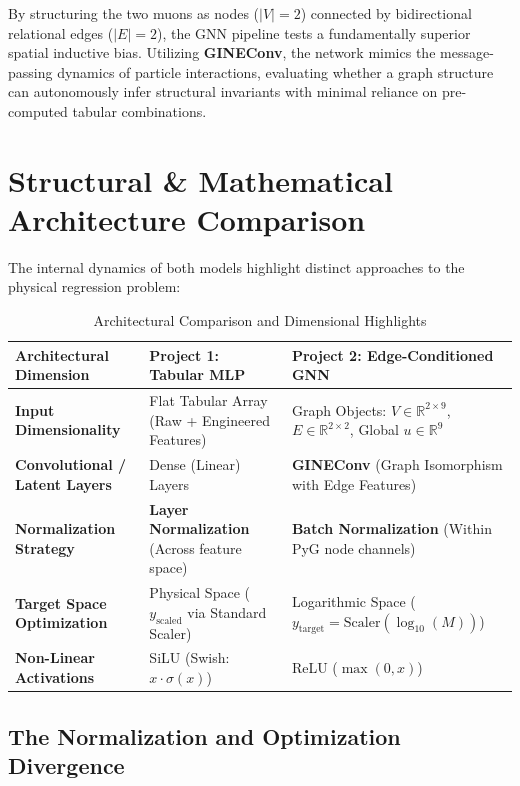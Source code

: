 \documentclass[11pt,a4paper,oneside]{article}
\begin{document}
By structuring the two muons as nodes ($\vert{}V\vert{} = 2$) connected by bidirectional relational edges ($\vert{}E\vert{} = 2$), the GNN pipeline tests a fundamentally superior spatial inductive bias. Utilizing \textbf{GINEConv}, the network mimics the message-passing dynamics of particle interactions, evaluating whether a graph structure can autonomously infer structural invariants with minimal reliance on pre-computed tabular combinations.

\section{Structural \& Mathematical Architecture Comparison}

The internal dynamics of both models highlight distinct approaches to the physical regression problem:

\begin{table}[h!]
\centering
\caption{Architectural Comparison and Dimensional Highlights}
\vspace{0.5em}
\small
\begin{tabular}{p{4.5cm} p{5.2cm} p{5.2cm}}
\hline
\textbf{Architectural Dimension} & \textbf{Project 1: Tabular MLP} & \textbf{Project 2: Edge-Conditioned GNN} \\ \hline
\textbf{Input Dimensionality} & Flat Tabular Array (Raw + Engineered Features) & Graph Objects: $V \in \mathbb{R}^{2 \times 9}$, $E \in \mathbb{R}^{2 \times 2}$, Global $u \in \mathbb{R}^9$ \\ \rowcolor{lightgrey}
\textbf{Convolutional / Latent Layers} & Dense (Linear) Layers & \textbf{GINEConv} (Graph Isomorphism with Edge Features) \\ 
\textbf{Normalization Strategy} & \textbf{Layer Normalization} (Across feature space) & \textbf{Batch Normalization} (Within PyG node channels) \\ \rowcolor{lightgrey}
\textbf{Target Space Optimization} & Physical Space ($y_{\text{scaled}}$ via Standard Scaler) & Logarithmic Space ($y_{\text{target}} = \text{Scaler}(\log_{10}(M))$) \\ 
\textbf{Non-Linear Activations} & SiLU (Swish: $x \cdot \sigma(x)$) & ReLU (${\max}(0, x)$) \\ \hline
\end{tabular}
\end{table}

\subsection*{The Normalization and Optimization Divergence}
\end{document}
